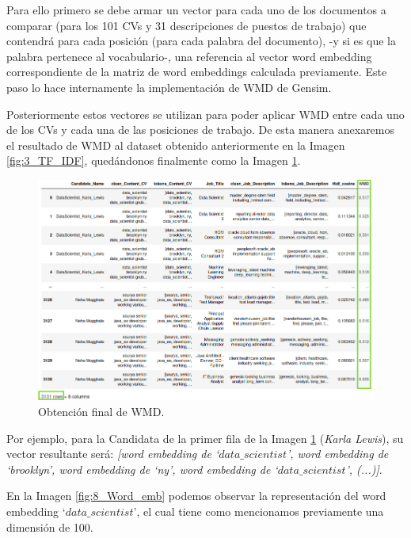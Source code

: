 \documentclass[12pt,a4paper]{article}
\begin{document}
\begin{sloppypar}
Para ello primero se debe armar un vector para cada uno de los documentos a comparar (para los 101 CVs y 31 descripciones de puestos de trabajo) que contendrá para cada posición (para cada palabra del documento), -y si es que la palabra pertenece al vocabulario-, una referencia al vector word embedding correspondiente de la matriz de word embeddings calculada previamente. Este paso lo hace internamente la implementación de WMD de Gensim.

Posteriormente estos vectores se utilizan para poder aplicar WMD entre cada uno de los CVs y cada una de las posiciones de trabajo. De esta manera anexaremos el resultado de WMD al dataset obtenido anteriormente en la Imagen \ref{fig:3_TF_IDF}, quedándonos finalmente como la Imagen \ref{fig:7_Calculo_WMD}.

\begin{figure}[H] 
 \centering
 \includegraphics[width=1\textwidth]{images/implementacion_5/7_Calculo_WMD.png}
\captionsetup{justification=centering,margin=3cm}
 \caption{Obtención final de WMD.} 
 \label{fig:7_Calculo_WMD}
\end{figure}

\cleardoublepage

Por ejemplo, para la Candidata de la primer fila de la Imagen \ref{fig:7_Calculo_WMD} (\textit{Karla Lewis}), su vector resultante será: \textit{[word embedding de ‘$data\_scientist$’, word embedding de ‘brooklyn’, word embedding de ‘ny’, word embedding de ‘$data\_scientist$’, (...)]}. 

En la Imagen \ref{fig:8_Word_emb} podemos observar la representación del word embedding ‘$data\_scientist$’, el cual tiene como mencionamos previamente una dimensión de 100. 


\end{sloppypar}
\end{document}

